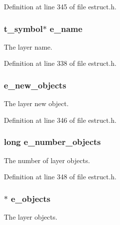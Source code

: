 Definition at line 345 of file estruct.\-h.

\hypertarget{struct__elayer_a6d8c2140844c7949fe9bc0384b2129d8}{
\subsubsection[{e\-\_\-name}]{\setlength{\rightskip}{0pt plus 5cm}t\-\_\-symbol$\ast$ e\-\_\-name}}\label{struct__elayer_a6d8c2140844c7949fe9bc0384b2129d8}
The layer name. 

Definition at line 338 of file estruct.\-h.

\hypertarget{struct__elayer_a793a735e42cff87ab0df8772c76fe039}{
\subsubsection[{e\-\_\-new\-\_\-objects}]{ e\-\_\-new\-\_\-objects}}\label{struct__elayer_a793a735e42cff87ab0df8772c76fe039}
The layer new object. 

Definition at line 346 of file estruct.\-h.

\hypertarget{struct__elayer_ad5b10c31f81ecf9116b72b70b25f9e79}{
\subsubsection[{e\-\_\-number\-\_\-objects}]{\setlength{\rightskip}{0pt plus 5cm}long e\-\_\-number\-\_\-objects}}\label{struct__elayer_ad5b10c31f81ecf9116b72b70b25f9e79}
The number of layer objects. 

Definition at line 348 of file estruct.\-h.

\hypertarget{struct__elayer_a6f0b120b9e9be17af36ba96a368ffccb}{
\subsubsection[{e\-\_\-objects}]{$\ast$ e\-\_\-objects}}\label{struct__elayer_a6f0b120b9e9be17af36ba96a368ffccb}
The layer objects. 

